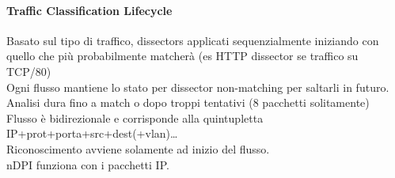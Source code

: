 \documentclass[10pt]{book}
\begin{document}
\paragraph{Traffic Classification Lifecycle} Basato sul tipo di traffico, dissectors applicati sequenzialmente iniziando con quello che più probabilmente matcherà (es HTTP dissector se traffico su TCP/80)\\
Ogni flusso mantiene lo stato per dissector non-matching per saltarli in futuro.\\
Analisi dura fino a match o dopo troppi tentativi (8 pacchetti solitamente)\\
Flusso è bidirezionale e corrisponde alla quintupletta IP+prot+porta+src+dest(+vlan)\ldots\\
Riconoscimento avviene solamente ad inizio del flusso.\\
nDPI funziona con i pacchetti IP.
\end{document}

